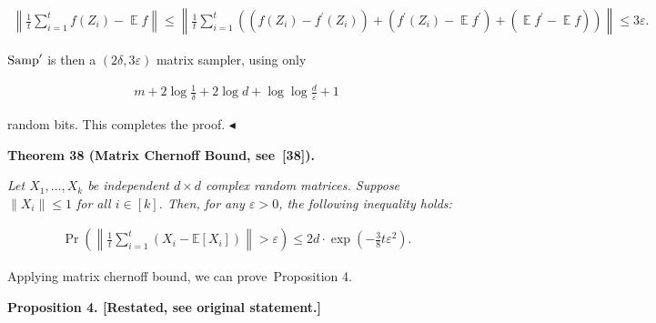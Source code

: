 \documentclass[10pt,a4paper]{article}
\begin{document}
\[\begin{gathered}
\displaystyle\left\|\frac{1}{t}\sum_{i=1}^{t}f(Z_{i})-\operatorname*{\mathbb{E}}f\right\| \displaystyle\leq\left\|\frac{1}{t}\sum_{i=1}^{t}\left((f(Z_{i})-f^{\prime}(Z_{i}))+(f^{\prime}(Z_{i})-\operatorname*{\mathbb{E}}f^{\prime})+(\operatorname*{\mathbb{E}}f^{\prime}-\operatorname*{\mathbb{E}}f)\right)\right\|\leq 3\varepsilon.
\end{gathered}\]


$\textup{{Samp}}^{\prime}$ is then a $(2\delta,3\varepsilon)$ matrix sampler, using only\par


\[\begin{gathered}
m+2\log\frac{1}{\delta}+2\log d+\log\log\frac{d}{\varepsilon}+1
\end{gathered}\]


random bits.
This completes the proof.
$\blacktriangleleft$\par





\par\medskip\noindent\textbf{
\textbf{Theorem 38}\textbf{ }(Matrix Chernoff Bound, see [38])\textbf{.}
}\par



\emph{Let $X_{1},\dots,X_{k}$ be independent $d\times d$ complex random matrices. Suppose $\|X_{i}\|\leq 1$ for all $i\in[k]$. Then, for any $\varepsilon>0$, the following inequality holds:}\par


\[\begin{gathered}
\Pr\left(\left\|\frac{1}{t}\sum_{i=1}^{t}\left(X_{i}-\mathbb{E}[X_{i}]\right)\right\|>\varepsilon\right)\leq 2d\cdot\exp\left(-\frac{3}{8}t\varepsilon^{2}\right).
\end{gathered}\]






Applying matrix chernoff bound, we can prove Proposition 4.\par






\par\medskip\noindent\textbf{
\textbf{Proposition 4}\textbf{.}
[Restated, see original statement.]}\par
\end{document}
